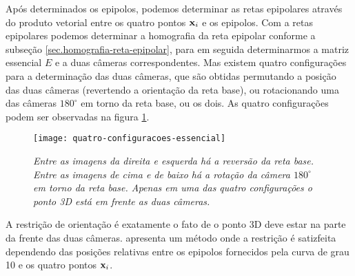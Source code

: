 Após determinados os epipolos, podemos determinar as retas epipolares através do produto vetorial entre os quatro pontos $\mathbf{x}_i$ e os epipolos. Com a retas epipolares podemos determinar a homografia da reta epipolar conforme a subseção \ref{sec.homografia-reta-epipolar}, para em seguida determinarmos a matriz essencial $E$ e a duas câmeras correspondentes. Mas existem quatro configurações para a determinação das duas câmeras, que são obtidas permutando a posição das duas câmeras (revertendo a orientação da reta base), ou rotacionando uma das câmeras $180^\circ$ em torno da reta base, ou os dois. As quatro configurações podem ser observadas na figura \ref{fig.quatro-essencial}. 
\begin{figure}[!htb]
\centering
\texttt{[image: quatro-configuracoes-essencial]}
\caption{{\it Entre as imagens da direita e esquerda há a reversão da reta base. Entre as imagens de cima e de baixo há a rotação da câmera $180^\circ$ em torno da reta base. Apenas em uma das quatro configurações o ponto 3D está em frente as duas câmeras.}}
\label{fig.quatro-essencial}
\end{figure}
A restrição de orientação é exatamente o fato de o ponto 3D deve estar na parte da frente das duas câmeras. \citep{2503343} apresenta um método onde a restrição é satizfeita dependendo das posições relativas entre os epipolos fornecidos pela curva de grau 10 e os quatro pontos $\mathbf{x}_i$.

